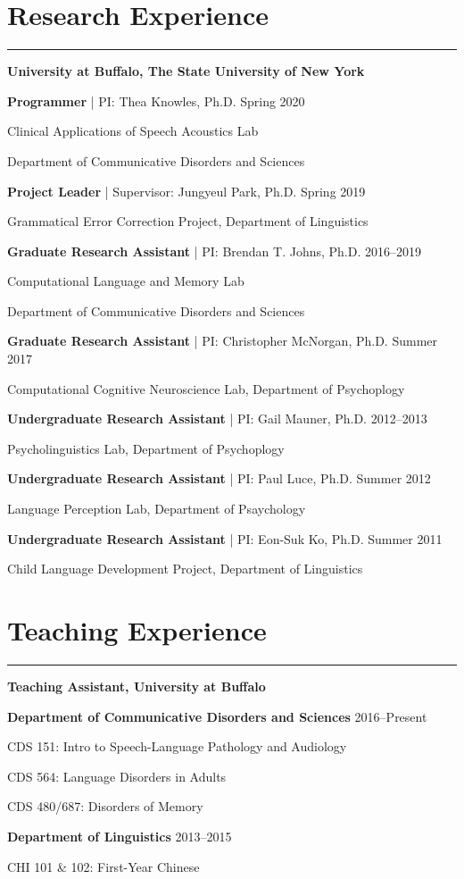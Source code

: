 \documentclass[11pt]{article}
\newcommand{\resumesection}[1]{\vspace{-0.2cm}\section*{#1}\vspace{-0.2cm}\hrule\vspace{0.2cm}}
\begin{document}
\resumesection{Research Experience}
\textbf{University at Buffalo, The State University of New York}

\textbf{Programmer} | PI: Thea Knowles, Ph.D. \hfill Spring 2020

\quad Clinical Applications of Speech Acoustics Lab

\quad Department of Communicative Disorders and Sciences

\textbf{Project Leader} | Supervisor: Jungyeul Park, Ph.D. \hfill Spring 2019

\quad Grammatical Error Correction Project, Department of Linguistics

\textbf{Graduate Research Assistant} | PI: Brendan T. Johns, Ph.D. \hfill 2016--2019

\quad Computational Language and Memory Lab

\quad Department of Communicative Disorders and Sciences

\textbf{Graduate Research Assistant} | PI: Christopher McNorgan, Ph.D. \hfill Summer 2017

\quad Computational Cognitive Neuroscience Lab, Department of Psychoplogy

\textbf{Undergraduate Research Assistant} | PI: Gail Mauner, Ph.D. \hfill 2012--2013

\quad Psycholinguistics Lab, Department of Psychoplogy

\textbf{Undergraduate Research Assistant} | PI: Paul Luce, Ph.D. \hfill Summer 2012

\quad Language Perception Lab, Department of Psaychology

\textbf{Undergraduate Research Assistant} | PI: Eon-Suk Ko, Ph.D. \hfill Summer 2011

\quad Child Language Development Project, Department of Linguistics

\resumesection{Teaching Experience}
\textbf{Teaching Assistant, University at Buffalo}

\textbf{Department of Communicative Disorders and Sciences} \hfill 2016--Present

\quad CDS 151: Intro to Speech-Language Pathology and Audiology

\quad CDS 564: Language Disorders in Adults

\quad CDS 480/687: Disorders of Memory

\textbf{Department of Linguistics} \hfill 2013--2015

\quad CHI 101 \& 102: First-Year Chinese
\end{document}
